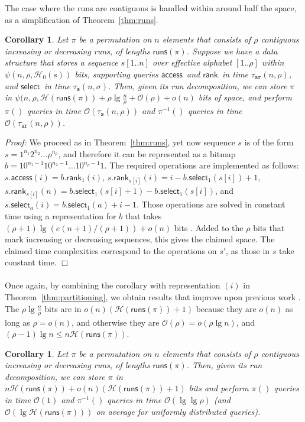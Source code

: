 \documentclass[11pt]{article}
\newtheorem{corollary}[theorem]{Corollary}
\newenvironment{proof}{\textit{Proof:}}{\hfill$\Box$ \paragraph{} }
\providecommand{\pii}{\ensuremath{\pi^{-1}}}
\newcommand{\Oh}[1]
    {\ensuremath{\mathcal{O}\left( {#1} \right)}}
\newcommand{\access}
    {\ensuremath{\mathsf{access}}}
\newcommand{\rank}
    {\ensuremath{\mathsf{rank}}}
\newcommand{\select}
    {\ensuremath{\mathsf{select}}}
\newcommand{\runs}
    {\ensuremath{\mathsf{runs}}}
\newcommand{\HH}{\mathcal{H}}
\newcommand{\Ho}{\HH_0}
\begin{document}
\smallskip

The case where the runs are contiguous is handled within around half the 
space, as a simplification of Theorem~\ref{thm:runs}.

\begin{corollary} \label{cor:contruns-gral}
  Let $\pi$ be a permutation on $n$ elements that consists of $\rho$
  contiguous increasing or decreasing runs, of lengths $\runs (\pi)$.
  Suppose we have a data structure that stores a sequence $s[1..n]$
  over effective alphabet $[1..\rho]$ within $\psi(n,\rho,\Ho(s))$ bits,
  supporting queries \access\ and \rank\ in time $\tau_\mathtt{ar}(n,\rho)$, 
  and \select\ in time $\tau_\mathtt{s}(n,\sigma)$.
Then, given its run decomposition, we can store $\pi$ in 
  $\psi(n,\rho,\HH(\runs(\pi)) + \rho\lg\frac{n}{\rho}+\Oh{\rho}+o(n)$ bits of 
  space, and perform $\pi()$ queries in time $\Oh{\tau_\mathtt{s}(n,\rho)}$ and 
  $\pii()$ queries in time $\Oh{\tau_\mathtt{ar}(n,\rho)}$.
\end{corollary}
\begin{proof}
We proceed as in Theorem~\ref{thm:runs}, yet now sequence $s$ is of the form
$s = 1^{n_1} 2^{n_2} \ldots \rho^{n_\rho}$, and therefore it can be represented
as a bitmap $b=10^{n_1-1} 10^{n_2-1}\ldots 10^{n_\rho-1}1$. The required
operations are implemented as follows: $s.\access(i) = b.\rank_1(i)$,
$s.\rank_{s[i]}(i) = i-b.\select_1(s[i])+1$,
$s.\rank_{s[i]}(n) = b.\select_1(s[i]+1)-b.\select_1(s[i])$,
and $s.\select_a(i) = b.\select_1(a)+i-1$. Those operations are solved in
constant time using a representation for $b$ that takes
$(\rho+1)\lg(e(n+1)/(\rho+1))+o(n)$ bits
\cite{RRR02}. Added to the $\rho$ bits that mark increasing or decreasing
sequences, this gives the claimed space. The claimed time complexities 
correspond to the operations on $s'$, as those in $s$ take constant time.
\end{proof}

Once again, by combining the corollary with representation $(i)$ in 
Theorem~\ref{thm:partitioning}, we 
obtain results that improve upon previous work \cite{BN09,BN11}.
The $\rho\lg\frac{n}{\rho}$ bits are in $o(n)(\HH(\runs(\pi))+1)$ 
because they are $o(n)$ as long as $\rho = o(n)$, and otherwise they are
$\Oh{\rho} = o(\rho\lg n)$, and $(\rho-1)\lg n \le n\HH(\runs(\pi))$.

\begin{corollary} \label{cor:contruns}
  Let $\pi$ be a permutation on $n$ elements that consists of $\rho$
  contiguous increasing or decreasing runs, of lengths $\runs (\pi)$.
Then, given its run decomposition, we can store $\pi$ in 
  \(n \HH (\runs (\pi)) + o(n)(\HH (\runs (\pi)) + 1)\) bits and 
  perform $\pi()$ queries in time $\Oh{1}$ and $\pii()$ queries in
  time $\Oh{\lg\lg\rho}$ (and $\Oh{\lg\HH(\runs(\pi))}$ on average for 
  uniformly distributed queries).
\end{corollary}
\end{document}
